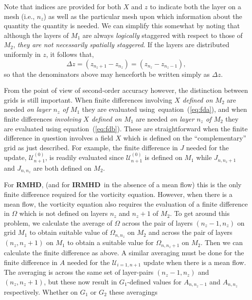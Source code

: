 \documentclass[12pt]{memoir}
\newcommand{\irmhd}{\textbf{IRMHD}}
\newcommand{\hrmhd}{\textbf{RMHD}}
\newcommand{\ufield}{\mathscr{U}}
\begin{document}
%
Note that indices are provided for both $X$ and $z$ to indicate both
the layer on a mesh (i.e., $n_z$) as well as the particular mesh upon
which information about the quantity the quantity is needed. We can
simplify this somewhat by noting that although the layers of $M_1$
are always {\em logically} staggered with respect to those of $M_2$,
\textit{ they are not necessarily spatially staggered}. If the layers
are distributed uniformly in $z$, it follows that,
%
\begin{equation}
  \Delta z = (z_{n_z+1}-z_{n_z}) = (z_{n_z} - z_{n_z-1}),
\end{equation}
%
so that the denominators above may henceforth be written simply
as $\Delta z$. 
%
\par
%
From the point of view of second-order accuracy however, the
distinction between grids is still important.  When finite
differences involving \textit{$X$ defined on $M_2$} are
needed \textit{on layer $n_z$ of $M_1$} they are evaluated
using~equation~(\ref{eq:fda}), and when finite differences
\textit{involving $X$ defined on $M_1$} are needed
\textit{on layer $n_z$ of $M_2$} they are evaluated using
equation~(\ref{eq:fdb}). These are straightforward when
the finite difference in question involves a field $X$
which is defined on the ``complementary'' grid as just
described. For example, the finite difference in $J$
needed for the update, $\ufield^{(0)}_{n+1}$, is readily
evaluated since $\ufield^{(0)}_{n+1}$ is defined on $M_1$
while $J_{n,n_z+1}$ and $J_{n,n_z}$ are both defined
on $M_2$.
%
\par 
%
For \hrmhd, (and for \irmhd\ in the absence of a mean flow)
this is the only finite difference required for the vorticity
equation. However, when there is a mean flow, the vorticity
equation also requires the evaluation of a finite difference
in $\Omega$ which is not defined on layers $n_z$ and $n_z+1$
of $M_2$. To get around this problem, we calculate the average
of $\Omega$ across the pair of layers $(n_z-1,n_z)$ on
grid $M_1$ to obtain suitable value of $\Omega_{n,n_z}$ on
$M_2$ and across the pair of layers $(n_z,n_z+1)$ on $M_1$
to obtain a suitable value for $\Omega_{n,n_z+1}$ on $M_2$.
Then we can calculate the finite difference as above. A similar
averaging must be done for the finite difference in $A$
needed for the $\ufield_{i=1,n+1}$ update when there is a
mean flow. The averaging is across the same set of layer-pairs
$(n_z-1,n_z)$ and $(n_z,n_z+1)$, but these now result in
$G_1$-defined values for $A_{n,n_z-1}$ and $A_{n,n_z}$
respectively. Whether on $G_1$ or $G_2$ these averagings
\end{document}
